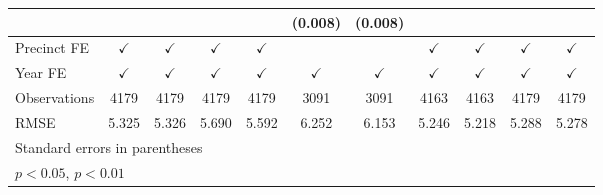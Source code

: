 \documentclass[preview,12pt,varwidth]{standalone}
\begin{document}
\begin{sidewaystable}[htbp]
\begin{tabular}{l*{10}{c}}
                    &                    &                    &                    &                    &     (0.008)        &     (0.008)        &                    &                    &                    &                    \\
[1em]
\hline Precinct FE  &$\checkmark$        &$\checkmark$        &$\checkmark$        &$\checkmark$        &                    &                    &$\checkmark$        &$\checkmark$        &$\checkmark$        &$\checkmark$        \\
[1em]
Year FE             &$\checkmark$        &$\checkmark$        &$\checkmark$        &$\checkmark$        &$\checkmark$        &$\checkmark$        &$\checkmark$        &$\checkmark$        &$\checkmark$        &$\checkmark$        \\
\hline
Observations        &        4179        &        4179        &        4179        &        4179        &        3091        &        3091        &        4163        &        4163        &        4179        &        4179        \\
RMSE                &       5.325        &       5.326        &       5.690        &       5.592        &       6.252        &       6.153        &       5.246        &       5.218        &       5.288        &       5.278        \\
\hline\hline
\multicolumn{11}{l}{\footnotesize Standard errors in parentheses}\\
\multicolumn{11}{l}{\footnotesize \sym{*} \(p<0.05\), \sym{**} \(p<0.01\)}\\
\end{tabular}
\end{sidewaystable}
\end{document}
